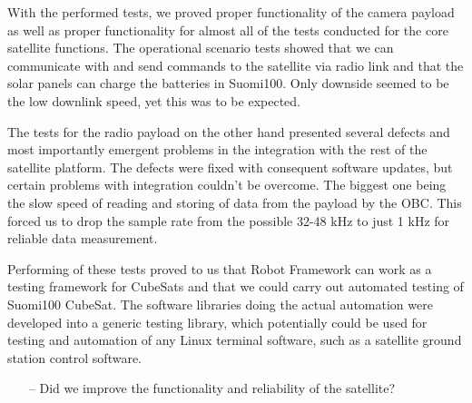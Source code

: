 \documentclass[english,12pt,a4paper,pdftex,elec,utf8]{aaltothesis}
\begin{document}
With the performed tests, we proved proper functionality of the camera payload as well as proper functionality for almost all of the tests conducted for the core satellite functions.   The operational scenario tests showed that we can communicate with and send commands to the satellite via radio link and that the solar panels can charge the batteries in Suomi100. Only downside seemed to be the low downlink speed, yet this was to be expected.\par 
The tests for the radio payload on the other hand presented several defects and most importantly emergent problems in the integration with the rest of the satellite platform. The defects were fixed with consequent software updates, but certain problems with integration couldn't be overcome. The biggest one being the slow speed of reading and storing of data from the payload by the OBC. This forced us to drop the sample rate from the possible 32-48 kHz to just 1 kHz for reliable data measurement.\par  
Performing of these tests proved to us that Robot Framework can work as a testing framework for CubeSats and that we could carry out automated testing of Suomi100 CubeSat. The software libraries doing the actual automation were developed into a generic testing library, which potentially could be used for testing and automation of any Linux terminal software, such as a satellite ground station control software.\par 

\begin{itemize}
\item[--]Did we improve the functionality and reliability of the satellite?
\end{itemize}



\clearpage
\end{document}
